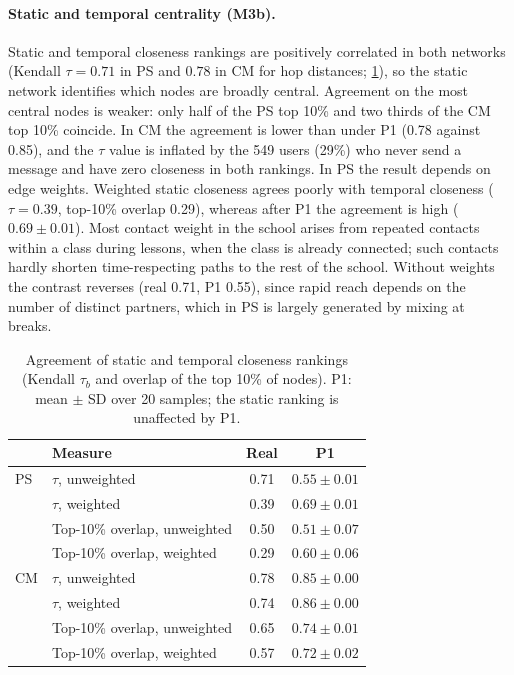 \paragraph{Static and temporal centrality (M3b).}
Static and temporal closeness rankings are positively correlated in both networks
(Kendall $\tau=0.71$ in PS and $0.78$ in CM for hop distances; \cref{tab:m3b}), so the static
network identifies which nodes are broadly central. Agreement on the most central nodes is
weaker: only half of the PS top 10\% and two thirds of the CM top 10\% coincide. In CM the
agreement is lower than under P1 (0.78 against 0.85), and the $\tau$ value is inflated by
the 549 users (29\%) who never send a message and have zero closeness in both rankings.
In PS the result depends on edge weights. Weighted static closeness agrees poorly with
temporal closeness ($\tau=0.39$, top-10\% overlap 0.29), whereas after P1 the agreement is
high ($0.69\pm0.01$). Most contact weight in the school arises from repeated contacts within
a class during lessons, when the class is already connected; such contacts hardly shorten
time-respecting paths to the rest of the school. Without weights the contrast reverses
(real 0.71, P1 0.55), since rapid reach depends on the number of distinct partners, which
in PS is largely generated by mixing at breaks.

\begin{table}[t]
\centering\small
\begin{tabular*}{\columnwidth}{@{\extracolsep{\fill}}llcc@{}}
\toprule
 & Measure & Real & P1 \\
\midrule
PS & $\tau$, unweighted & 0.71 & $0.55\pm0.01$ \\
   & $\tau$, weighted & 0.39 & $0.69\pm0.01$ \\
   & Top-10\% overlap, unweighted & 0.50 & $0.51\pm0.07$ \\
   & Top-10\% overlap, weighted & 0.29 & $0.60\pm0.06$ \\
\midrule
CM & $\tau$, unweighted & 0.78 & $0.85\pm0.00$ \\
   & $\tau$, weighted & 0.74 & $0.86\pm0.00$ \\
   & Top-10\% overlap, unweighted & 0.65 & $0.74\pm0.01$ \\
   & Top-10\% overlap, weighted & 0.57 & $0.72\pm0.02$ \\
\bottomrule
\end{tabular*}
\caption{Agreement of static and temporal closeness rankings (Kendall $\tau_b$ and overlap of
the top 10\% of nodes). P1: mean $\pm$ SD over 20 samples; the static ranking is unaffected by P1.}
\label{tab:m3b}
\end{table}

